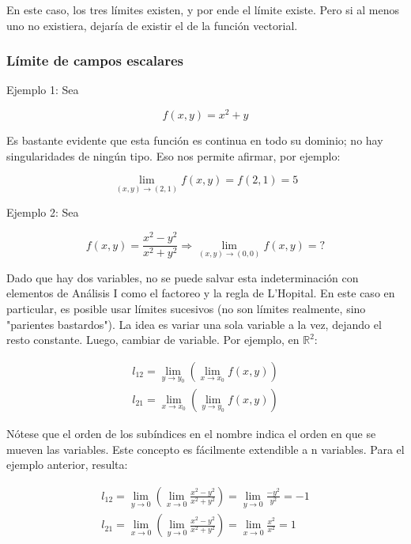 \documentclass{article}
\renewcommand{\Bbb}{\mathbb}
\begin{document}
En este caso, los tres límites existen, y por ende el límite existe. Pero si al menos uno no existiera, dejaría de existir el de la función vectorial.

\subsubsection{Límite de campos escalares}

Ejemplo 1: Sea

\begin{equation}
f(x,y) = x^2 + y
\end{equation}

Es bastante evidente que esta función es continua en todo su dominio; no hay singularidades de ningún tipo. Eso nos permite afirmar, por ejemplo:

\begin{equation}
\lim_{(x,y) \rightarrow (2,1)} f(x,y) = f(2,1) = 5
\end{equation}

Ejemplo 2: Sea

\begin{equation}
f(x,y) = \frac{x^2 - y^2}{x^2 + y^2} \Rightarrow \lim_{(x,y) \rightarrow (0,0)} f(x,y) = ?
\end{equation}

Dado que hay dos variables, no se puede salvar esta indeterminación con elementos de Análisis I como el factoreo y la regla de L'Hopital. En este caso en particular, es posible usar límites sucesivos (no son límites realmente, sino "parientes bastardos"). La idea es variar una sola variable a la vez, dejando el resto constante. Luego, cambiar de variable. Por ejemplo, en $\Bbb R^2$:

\begin{subequations}
\begin{align}
l_{12} = \lim_{y \rightarrow y_0} \left( \lim_{x \rightarrow x_0} f(x,y) \right) \\
l_{21} = \lim_{x \rightarrow x_0} \left( \lim_{y \rightarrow y_0} f(x,y) \right)
\end{align}
\end{subequations}

Nótese que el orden de los subíndices en el nombre indica el orden en que se mueven las variables. Este concepto es fácilmente extendible a n variables. Para el ejemplo anterior, resulta:

\begin{subequations}
\begin{align}
l_{12} = \lim_{y \rightarrow 0} \left( \lim_{x \rightarrow 0} \frac{x^2-y^2}{x^2 + y^2} \right) = \lim_{y \rightarrow 0} \frac{-y^2}{y^2} = -1 \\
l_{21} = \lim_{x \rightarrow 0} \left( \lim_{y \rightarrow 0} \frac{x^2-y^2}{x^2 + y^2} \right) = \lim_{x \rightarrow 0} \frac{x^2}{x^2} = 1
\end{align}
\end{subequations}
\end{document}
